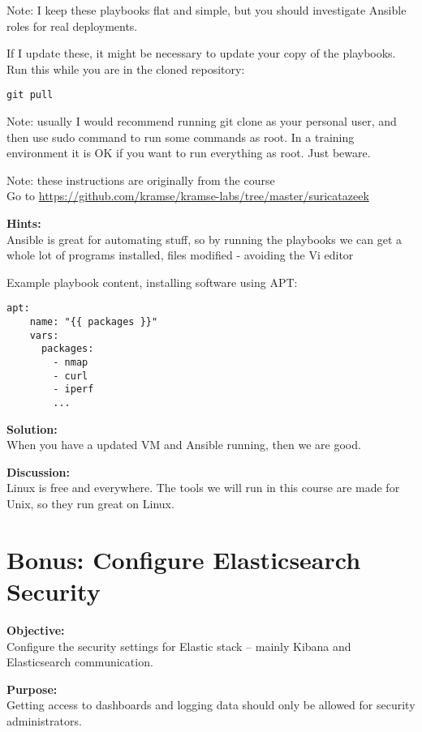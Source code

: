 \documentclass[a4paper,11pt,notitlepage]{report}
\begin{document}
Note: I keep these playbooks flat and simple, but you should investigate Ansible roles for real deployments.

If I update these, it might be necessary to update your copy of the playbooks. Run this while you are in the cloned repository:

\begin{verbatim}
git pull
\end{verbatim}

Note: usually I would recommend running git clone as your personal user, and then use sudo command to run some commands as root. In a training environment it is OK if you want to run everything as root. Just beware.

Note: these instructions are originally from the course\\
Go to \url{https://github.com/kramse/kramse-labs/tree/master/suricatazeek}

{\bf Hints:}\\
Ansible is great for automating stuff, so by running the playbooks we can get a whole lot of programs installed, files modified - avoiding the Vi editor \smiley

Example playbook content, installing software using APT:
\begin{verbatim}
apt:
    name: "{{ packages }}"
    vars:
      packages:
        - nmap
        - curl
        - iperf
        ...
\end{verbatim}

{\bf Solution:}\\
When you have a updated VM and Ansible running, then we are good.

{\bf Discussion:}\\
Linux is free and everywhere. The tools we will run in this course are made for Unix, so they run great on Linux.

\chapter{Bonus: Configure Elasticsearch Security}
\label{ex:xpack-security}

{\bf Objective:}\\
Configure the security settings for Elastic stack -- mainly Kibana and Elasticsearch communication.

{\bf Purpose:}\\
Getting access to dashboards and logging data should only be allowed for security administrators.
\end{document}
